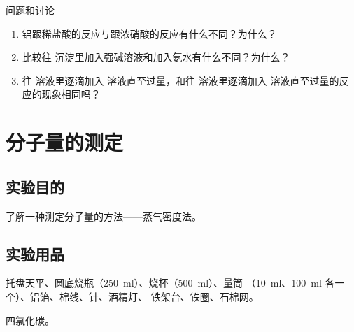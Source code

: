 \begin{Theorem}{问题和讨论}
\begin{enumerate}[1.]
  \item 铝跟稀盐酸的反应与跟浓硝酸的反应有什么不同？为什么？
  \item 比较往  沉淀里加入强碱溶液和加入氨水有什么不同？为什么？
  \item 往  溶液里逐滴加入  溶液直至过量，和往  溶液里逐滴加入  溶液直至过量的反应的现象相同吗？
\end{enumerate}
\end{Theorem}


\section{分子量的测定}
\subsection*{实验目的}
了解一种测定分子量的方法——蒸气密度法。

\subsection*{实验用品}
托盘天平、圆底烧瓶（\qty{250}{ml}）、烧杯（\qty{500}{ml}）、量筒 （\qty{10}{ml}、\qty{100}{ml} 各一个）、铝箔、棉线、针、酒精灯、 铁架台、铁圈、石棉网。

四氯化碳。
